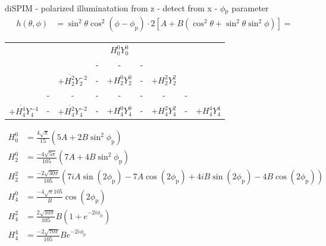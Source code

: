 \documentclass[presentation]{beamer}
\begin{document}
\begin{frame}[label=sec-9]{diSPIM - polarized illuminatation from z - detect from x - $\phi$$_{\text{p}}$ parameter}
\small
\begin{align*}
h(\theta, \phi) &= \sin^2\theta\cos^2(\phi - \phi_{\text{p}})\cdot2[A + B(\cos^2\theta + \sin^2\theta\sin^2\phi)] = 
\end{align*}
\tiny
\begin{center}
\begin{tabular}{ccccccccc} 
&&&&$H_0^0Y_0^0$&&&&\\
&&&-&-&-&&&\\
&&$+\overline{H_2^2}Y_2^{-2}$&-&+$H_2^0Y_2^0$&-&+$H_2^2Y_2^{2}$&&\\
&-&-&-&-&-&-&-&\\
$+\overline{H_4^4}Y_4^{-4}$&-&$+\overline{H_4^2}Y_4^{-2}$&-&$+H_4^0Y_4^0$&-&$+H_4^2Y_4^2$&-&$+H_4^4Y_4^4$\\
\end{tabular}
\end{center}
\begin{align*}
H_0^0 &= \frac{4\sqrt{\pi}}{15}(5A + 2B\sin^2\phi_{\text{p}})\\
H_2^0 &= \frac{-4\sqrt{5\pi}}{105}(7A + 4B\sin^2\phi_{\text{p}})\\
H_2^2 &= \frac{-2\sqrt{30\pi}}{105}(7iA\sin(2\phi_{\text{p}}) - 7A\cos(2\phi_{\text{p}}) + 4iB\sin(2\phi_{\text{p}}) - 4B\cos(2\phi_{\text{p}}))\\
H_4^0 &= \frac{-4\sqrt{\pi}{105}}B\cos(2\phi_{\text{p}})\\
H_4^2 &= \frac{2\sqrt{10\pi}}{105}B(1+e^{-2i\phi_{\text{p}}})\\
H_4^4 &= \frac{-2\sqrt{70\pi}}{105}Be^{-2i\phi_{\text{p}}}
\end{align*}
\end{frame}
\end{document}
